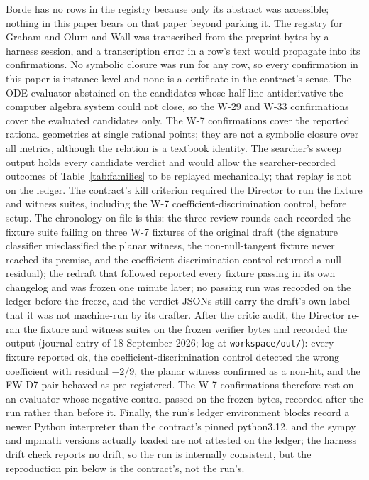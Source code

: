 \documentclass[11pt]{article}
\begin{document}
Borde \cite{borde1987} has no rows in the registry because only its abstract was accessible; nothing in this paper bears on that paper beyond parking it. The registry for Graham and Olum and Wall was transcribed from the preprint bytes by a harness session, and a transcription error in a row's text would propagate into its confirmations. No symbolic closure was run for any row, so every confirmation in this paper is instance-level and none is a certificate in the contract's sense. The ODE evaluator abstained on the candidates whose half-line antiderivative the computer algebra system could not close, so the W-29 and W-33 confirmations cover the evaluated candidates only. The W-7 confirmations cover the reported rational geometries at single rational points; they are not a symbolic closure over all metrics, although the relation is a textbook identity. The searcher's sweep output holds every candidate verdict and would allow the searcher-recorded outcomes of Table~\ref{tab:families} to be replayed mechanically; that replay is not on the ledger. The contract's kill criterion required the Director to run the fixture and witness suites, including the W-7 coefficient-discrimination control, before setup. The chronology on file is this: the three review rounds each recorded the fixture suite failing on three W-7 fixtures of the original draft (the signature classifier misclassified the planar witness, the non-null-tangent fixture never reached its premise, and the coefficient-discrimination control returned a null residual); the redraft that followed reported every fixture passing in its own changelog and was frozen one minute later; no passing run was recorded on the ledger before the freeze, and the verdict JSONs still carry the draft's own label that it was not machine-run by its drafter. After the critic audit, the Director re-ran the fixture and witness suites on the frozen verifier bytes and recorded the output (journal entry of 18 September 2026; log at \texttt{workspace/out/}): every fixture reported ok, the coefficient-discrimination control detected the wrong coefficient with residual $-2/9$, the planar witness confirmed as a non-hit, and the FW-D7 pair behaved as pre-registered. The W-7 confirmations therefore rest on an evaluator whose negative control passed on the frozen bytes, recorded after the run rather than before it. Finally, the run's ledger environment blocks record a newer Python interpreter than the contract's pinned python3.12, and the sympy and mpmath versions actually loaded are not attested on the ledger; the harness drift check reports no drift, so the run is internally consistent, but the reproduction pin below is the contract's, not the run's.
\end{document}
